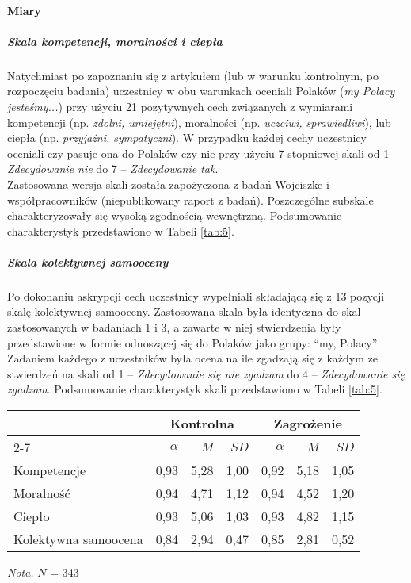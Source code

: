 \documentclass[man]{apa6}
\begin{document}
\paragraph{Miary}
\subparagraph{Skala kompetencji, moralności i ciepła}
Natychmiast po zapoznaniu się z artykułem (lub w warunku kontrolnym, po rozpoczęciu badania) uczestnicy w obu warunkach oceniali Polaków (\emph{my Polacy jesteśmy...}) przy użyciu 21 pozytywnych cech związanych z wymiarami kompetencji (np. \emph{zdolni, umiejętni}), moralności (np. \emph{uczciwi, sprawiedliwi}), lub ciepła (np. \emph{przyjaźni, sympatyczni}). W przypadku każdej cechy uczestnicy oceniali czy pasuje ona do Polaków czy nie przy użyciu 7-stopniowej skali od 1 -- \emph{Zdecydowanie nie} do 7 -- \emph{Zdecydowanie tak}.\\
Zastosowana wersja skali została zapożyczona z badań Wojciszke i współpracowników (niepublikowany raport z badań). Poszczególne subskale charakteryzowały się wysoką zgodnością wewnętrzną. Podsumowanie charakterystyk przedstawiono w Tabeli \ref{tab:5}.

\subparagraph{Skala kolektywnej samooceny}
Po dokonaniu askrypcji cech uczestnicy wypełniali składającą się z 13 pozycji skalę kolektywnej samooceny. Zastosowana skala była identyczna do skal zastosowanych w badaniach 1 i 3, a zawarte w niej stwierdzenia były przedstawione w formie odnoszącej się do Polaków jako grupy: ``my, Polacy'' Zadaniem każdego z uczestników była ocena na ile zgadzają się z każdym ze stwierdzeń na skali od 1 -- \emph{Zdecydowanie się nie zgadzam} do 4 -- \emph{Zdecydowanie się zgadzam}. Podsumowanie charakterystyk skali przedstawiono w Tabeli \ref{tab:5}.

\begin{table*}[htbp]
\vspace*{2em}
\centering
\begin{threeparttable}
\caption{Podstawowe statystyki opisowe dla skal użytych w Badaniu 4}
\label{tab:5}

\begin{tabular}{lrrrrrr}

\midrule
& \multicolumn{3}{c}{Kontrolna} & \multicolumn{3}{c}{Zagrożenie}  \\
\cline{2-7}
& $\alpha$ & $M$ & $SD$ & $\alpha$ & $M$ & $SD$  \\
\midrule
Kompetencje            & 0,93 & 5,28 & 1,00 & 0,92 & 5,18 & 1,05  \\
Moralność              & 0,94 & 4,71 & 1,12 & 0,94 & 4,52 & 1,20  \\
Ciepło                 & 0,93 & 5,06 & 1,03 & 0,93 & 4,82 & 1,15  \\
Kolektywna samoocena   & 0,84 & 2,94 & 0,47 & 0,85 & 2,81 & 0,52  \\

\bottomrule

\end{tabular}

\begin{tablenotes}
{\small
\textit{Nota.} $N$ = 343
}
\end{tablenotes}
\end{threeparttable}
\end{table*}
\end{document}
